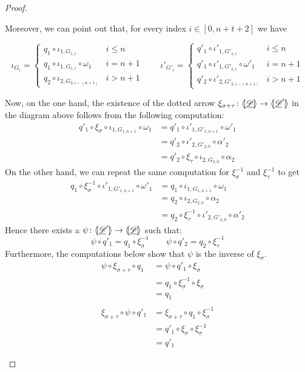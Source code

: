 \documentclass[a4paper,UKenglish,cleveref,pdftex, thm-restate,numberwithinsect]{lipics}
\newcommand{\dder}[1]{\mathscr{#1}}
\newcommand{\der}[1]{\underline{\dder{#1}}}
\newcommand{\lpro}{\langle \hspace{-1.85pt}[}
\newcommand{\rpro}{]\hspace{-1.85pt}\rangle}
\newcommand{\tpro}[1]{\lpro \der{#1}\rpro}
\begin{document}
\begin{proof}
\begin{itemize}
Moreover, we can point out that, for every index $i\in [0,n+t+2]$ we have

\[\iota_{G_i}=\begin{cases}q_1\circ \iota_{1, G_{1,i}} & i \leq n\\
	q_1\circ \iota_{1, G_{1, i}}\circ \omega_1& i=n+1\\
	q_2\circ \iota_{2, G_{2,i-(n+1)}} & i > n+1 
\end{cases} \qquad \iota'_{G'_i}=\begin{cases}q'_1\circ \iota'_{1, G'_{1,i}} & i \leq n\\
	q'_1\circ \iota'_{1, G'_{1, i}}\circ \omega'_1& i=n+1\\
	q'_2\circ \iota'_{2, G'_{2,i-(n+1)}} & i > n+1 
\end{cases}\]

Now, on the one hand, the existence of the dotted arrow $\xi_{\sigma+\tau}\colon \tpro{D}\to \lpro \der{D}'\rpro$ in the diagram above follows from the following computation:
\begin{align*}
	q'_1\circ \xi_\sigma \circ \iota_{1, G_{1,n+1}} \circ \omega_1&=q'_1\circ \iota'_{1,G'_{1, n+1}} \circ \omega'_1\\&= q'_2 \circ \iota'_{2, G'_{2,0}} \circ \alpha'_2\\&=q'_2\circ \xi_\tau \circ \iota_{2, G_{2,0}} \circ \alpha_2
\end{align*} 
On the other hand, we can repeat the same computation for $\xi^{-1}_\sigma$ and $\xi^{-1}_\tau$ to get
\begin{align*}
	q_1\circ \xi^{-1}_\sigma \circ \iota'_{1, G'_{1,n+1}} \circ \omega'_1&=q_1\circ \iota_{1,G_{1, n+1}} \circ \omega_1\\&= q_2 \circ \iota_{2, G_{2,0}} \circ \alpha_2\\&=q_2\circ \xi^{-1}_\tau \circ \iota'_{2, G'_{2,0}} \circ \alpha'_2
\end{align*} 
Hence there exists a $\psi\colon \lpro \der{D}'\rpro \to \tpro{D}$ such that:
\[\psi \circ q'_1=q_1\circ \xi^{-1}_\sigma \qquad \psi \circ q'_2=q_2\circ \xi^{-1}_\tau\]
Furthermore, the computations below show that $\psi$ is the inverse of $\xi_\sigma$.
\[\begin{split}
	\psi \circ \xi_{\sigma+\tau}\circ  q_1&=\psi \circ q'_1\circ \xi_\sigma \\&=q_1\circ \xi^{-1}_{\sigma}\circ \xi_\sigma\\&=q_1\\\\
	\xi_{\sigma+\tau}\circ \psi \circ q'_1&=\xi_{\sigma+\tau}\circ q_1\circ \xi^{-1}_\sigma \\&=q'_1\circ \xi_{\sigma}\circ \xi^{-1}_\sigma\\&=q'_1

\end{split}\]
\end{itemize}
\end{proof}
\end{document}
